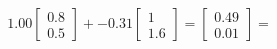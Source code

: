 \documentclass[preview]{standalone}
\begin{document}
\begin{align*}
1.00 \begin{bmatrix} 0.8 \\ 0.5 \end{bmatrix} + -0.31 \begin{bmatrix} 1 \\ 1.6 \end{bmatrix} = \begin{bmatrix} 0.49 \\ 0.01 \end{bmatrix} =
\end{align*}
\end{document}
